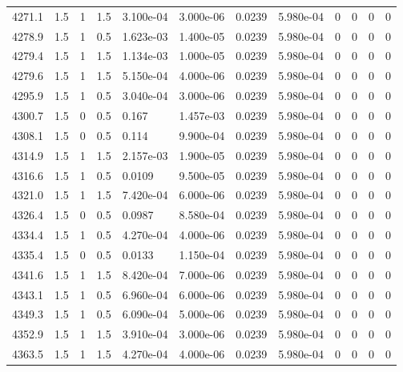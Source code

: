 \documentclass[preview]{standalone}
\begin{document}
{{{{{{{{{{{{{{{{{\begin{tabular}{L{1.2cm}C{1.2cm} C{0.3cm}C{0.5cm} C{1.4cm}C{1.4cm} C{1.4cm}C{1.4cm} C{1.6cm}C{1.6cm} C{1.6cm}C{1.6cm}}
  4271.1  &   1.5  & 1     & 1.5 &  3.100e-04  & 3.000e-06  &  0.0239&   5.980e-04& 0 & 0   &  0 & 0  \\ 
  4278.9  &   1.5  & 1     & 0.5 &  1.623e-03  & 1.400e-05  &  0.0239&   5.980e-04& 0 & 0   &  0 & 0  \\ 
  4279.4  &   1.5  & 1     & 1.5 &  1.134e-03  & 1.000e-05  &  0.0239&   5.980e-04& 0 & 0   &  0 & 0  \\ 
  4279.6  &   1.5  & 1     & 1.5 &  5.150e-04  & 4.000e-06  &  0.0239&   5.980e-04& 0 & 0   &  0 & 0  \\ 
  4295.9  &   1.5  & 1     & 0.5 &  3.040e-04  & 3.000e-06  &  0.0239&   5.980e-04& 0 & 0   &  0 & 0  \\ 
  4300.7  &   1.5  & 0     & 0.5 &  0.167  & 1.457e-03  &  0.0239&   5.980e-04& 0 & 0   &  0 & 0  \\ 
  4308.1  &   1.5  & 0     & 0.5 &  0.114  & 9.900e-04  &  0.0239&   5.980e-04& 0 & 0   &  0 & 0  \\ 
  4314.9  &   1.5  & 1     & 1.5 &  2.157e-03  & 1.900e-05  &  0.0239&   5.980e-04& 0 & 0   &  0 & 0  \\ 
  4316.6  &   1.5  & 1     & 0.5 &  0.0109  & 9.500e-05  &  0.0239&   5.980e-04& 0 & 0   &  0 & 0  \\ 
  4321.0  &   1.5  & 1     & 1.5 &  7.420e-04  & 6.000e-06  &  0.0239&   5.980e-04& 0 & 0   &  0 & 0  \\ 
  4326.4  &   1.5  & 0     & 0.5 &  0.0987  & 8.580e-04  &  0.0239&   5.980e-04& 0 & 0   &  0 & 0  \\ 
  4334.4  &   1.5  & 1     & 0.5 &  4.270e-04  & 4.000e-06  &  0.0239&   5.980e-04& 0 & 0   &  0 & 0  \\ 
  4335.4  &   1.5  & 0     & 0.5 &  0.0133  & 1.150e-04  &  0.0239&   5.980e-04& 0 & 0   &  0 & 0  \\ 
  4341.6  &   1.5  & 1     & 1.5 &  8.420e-04  & 7.000e-06  &  0.0239&   5.980e-04& 0 & 0   &  0 & 0  \\ 
  4343.1  &   1.5  & 1     & 0.5 &  6.960e-04  & 6.000e-06  &  0.0239&   5.980e-04& 0 & 0   &  0 & 0  \\ 
  4349.3  &   1.5  & 1     & 0.5 &  6.090e-04  & 5.000e-06  &  0.0239&   5.980e-04& 0 & 0   &  0 & 0  \\ 
  4352.9  &   1.5  & 1     & 1.5 &  3.910e-04  & 3.000e-06  &  0.0239&   5.980e-04& 0 & 0   &  0 & 0  \\ 
  4363.5  &   1.5  & 1     & 1.5 &  4.270e-04  & 4.000e-06  &  0.0239&   5.980e-04& 0 & 0   &  0 & 0  \\ 

\end{tabular}}}}}}}}}}}}}}}}}}
\end{document}
